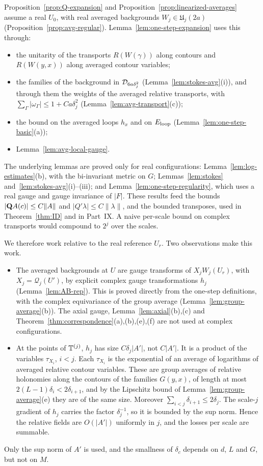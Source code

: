 Proposition~\ref{prop:Q-expansion} and Proposition~\ref{prop:linearized-averages} assume a real $U_0$, with real averaged backgrounds $W_j\in\mathfrak U_j(2a)$ (Proposition~\ref{prop:avg-regular}). Lemma~\ref{lem:one-step-expansion} uses this through:
\begin{itemize}
\item the unitarity of the transports $R(W(\gamma))$ along contours and $R(W(y,x))$ along averaged contour variables;
\item the families of the background in $\mathcal D_{6a\delta_j^2}$ (Lemma~\ref{lem:stokes-avg}(i)), and through them the weights of the averaged relative transports, with $\sum_\Gamma|\omega_\Gamma|\le1+Ca\delta_j^2$ (Lemma~\ref{lem:avg-transport}(c));
\item the bound on the averaged loops $h_x$ and on $E_{\rm loop}$ (Lemma~\ref{lem:one-step-basic}(a));
\item Lemma~\ref{lem:avg-local-gauge}.
\end{itemize}
The underlying lemmas are proved only for real configurations: Lemma~\ref{lem:log-estimates}(b), with the bi-invariant metric on $G$; Lemmas~\ref{lem:stokes} and~\ref{lem:stokes-avg}(i)--(iii); and Lemma~\ref{lem:one-step-regularity}, which uses a real gauge and gauge invariance of $|F|$. These results feed the bounds $|\mathbf Q A(c)|\le C\|A\|$ and $|Q'\lambda|\le C\|\lambda\|$, and the bounded transposes, used in Theorem~\ref{thm:ID} and in Part~IX. A naive per-scale bound on complex transports would compound to $2^{j}$ over the scales.

We therefore work relative to the real reference $U_r$. Two observations make this work.
\begin{itemize}
\item The averaged backgrounds at $U$ are gauge transforms of $X_jW_j(U_r)$, with $X_j=\mathcal Q_j(U')$, by explicit complex gauge transformations $h_j$ (Lemma~\ref{lem:AB-rep}). This is proved directly from the one-step definitions, with the complex equivariance of the group average (Lemma~\ref{lem:group-average}(b)). The axial gauge, Lemma~\ref{lem:axial}(b),(c) and Theorem~\ref{thm:correspondence}(a),(b),(e),(f) are not used at complex configurations.
\item At the points of $\mathbb T^{(j)}$, $h_j$ has size $C\delta_j|A'|$, not $C|A'|$. It is a product of the variables $\tau_{X_i}$, $i<j$. Each $\tau_{X_i}$ is the exponential of an average of logarithms of averaged relative contour variables. These are group averages of relative holonomies along the contours of the families $G(y,x)$, of length at most $2(L-1)\delta_i<2\delta_{i+1}$, and by the Lipschitz bound of Lemma~\ref{lem:group-average}(e) they are of the same size. Moreover $\sum_{i<j}\delta_{i+1}\le2\delta_j$. The scale-$j$ gradient of $h_j$ carries the factor $\delta_j^{-1}$, so it is bounded by the sup norm. Hence the relative fields are $O(|A'|)$ uniformly in $j$, and the losses per scale are summable.
\end{itemize}
Only the sup norm of $A'$ is used, and the smallness of $\delta_c$ depends on $d$, $L$ and $G$, but not on $M$.

